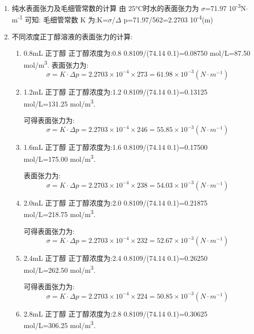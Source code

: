 \documentclass[11pt]{report}
\begin{document}
\begin{enumerate}
\item 纯水表面张力及毛细管常数的计算
\label{sec:orga9e4dd1}
     由 25°C时水的表面张力为 \(\sigma\)=71.97\texttimes{} 10\textsuperscript{-3}N\(\cdot\) m\textsuperscript{-1} 可知:
毛细管常数 K 为:K=\(\sigma\)/\(\Delta\) p=71.97/562=2.2703\texttimes{} 10\textsuperscript{-4}(m)
\item 不同浓度正丁醇溶液的表面张力的计算:
\label{sec:orgfda1f74}
\begin{enumerate}
\item 0.8mL 正丁醇
\label{sec:orgf716a79}
正丁醇浓度为:0.8\texttimes{} 0.8109/(74.14\texttimes{} 0.1)=0.08750 mol/L=87.50 mol/m\textsuperscript{3}.
表面张力为:
\[
    \sigma=K\cdot \Delta p=2.2703\times 10^{-4}\times 273=61.98\times 10^{-3}(N\cdot m^{-1})
    \]

\item 1.2mL 正丁醇
\label{sec:org04d5916}
正丁醇浓度为:1.2\texttimes{} 0.8109/(74.14\texttimes{} 0.1)=0.13125 mol/L=131.25 mol/m\textsuperscript{3}.

可得表面张力为:
\[
    \sigma=K\cdot \Delta p=2.2703\times 10^{-4}\times 246=55.85\times 10^{-3}(N\cdot m^{-1})
    \]

\item 1.6mL 正丁醇
\label{sec:orgcfc1c2e}
正丁醇浓度为:1.6\texttimes{} 0.8109/(74.14\texttimes{} 0.1)=0.17500 mol/L=175.00 mol/m\textsuperscript{3}.

表面张力为:
\[
    \sigma=K\cdot \Delta p=2.2703\times 10^{-4}\times 238=54.03\times 10^{-3}(N\cdot m^{-1})
    \]

\item 2.0mL 正丁醇
\label{sec:org19fccea}
正丁醇浓度为:2.0\texttimes{} 0.8109/(74.14\texttimes{} 0.1)=0.21875 mol/L=218.75 mol/m\textsuperscript{3}.

可得表面张力为:
\[
    \sigma=K\cdot \Delta p=2.2703\times 10^{-4}\times 232=52.67\times 10^{-3}(N\cdot m^{-1})
    \]

\item 2.4mL 正丁醇
\label{sec:org984724a}
正丁醇浓度为:2.4\texttimes{} 0.8109/(74.14\texttimes{} 0.1)=0.26250 mol/L=262.50 mol/m\textsuperscript{3}.

可得表面张力为:
\[
    \sigma=K\cdot \Delta p=2.2703\times 10^{-4}\times 224=50.85\times 10^{-3}(N\cdot m^{-1})
    \]

\item 2.8mL 正丁醇
\label{sec:org8b0a375}
正丁醇浓度为:2.8\texttimes{} 0.8109/(74.14\texttimes{} 0.1)=0.30625 mol/L=306.25 mol/m\textsuperscript{3}.


\end{enumerate}
\end{enumerate}
\end{document}
